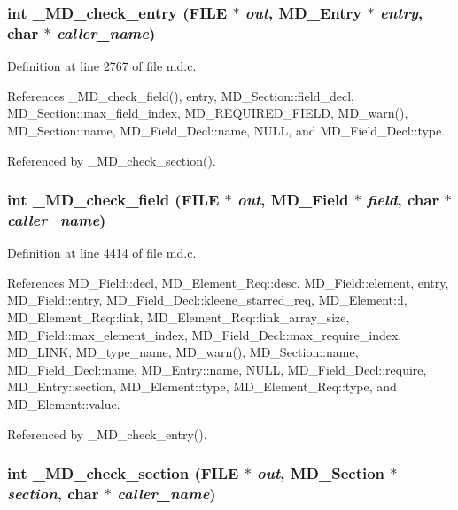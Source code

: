\subsubsection{\setlength{\rightskip}{0pt plus 5cm}int \_\-MD\_\-check\_\-entry (FILE $\ast$ {\em out}, \bf{MD\_\-Entry} $\ast$ {\em entry}, char $\ast$ {\em caller\_\-name})}\label{md_8c_5f7bc3cc69f39e3690dbdae2cd1d6507}




Definition at line 2767 of file md.c.

References \_\-MD\_\-check\_\-field(), entry, MD\_\-Section::field\_\-decl, MD\_\-Section::max\_\-field\_\-index, MD\_\-REQUIRED\_\-FIELD, MD\_\-warn(), MD\_\-Section::name, MD\_\-Field\_\-Decl::name, NULL, and MD\_\-Field\_\-Decl::type.

Referenced by \_\-MD\_\-check\_\-section().
\subsubsection{\setlength{\rightskip}{0pt plus 5cm}int \_\-MD\_\-check\_\-field (FILE $\ast$ {\em out}, \bf{MD\_\-Field} $\ast$ {\em field}, char $\ast$ {\em caller\_\-name})}\label{md_8c_e357e99d4f9c07917d1bc2e4c6859381}




Definition at line 4414 of file md.c.

References MD\_\-Field::decl, MD\_\-Element\_\-Req::desc, MD\_\-Field::element, entry, MD\_\-Field::entry, MD\_\-Field\_\-Decl::kleene\_\-starred\_\-req, MD\_\-Element::l, MD\_\-Element\_\-Req::link, MD\_\-Element\_\-Req::link\_\-array\_\-size, MD\_\-Field::max\_\-element\_\-index, MD\_\-Field\_\-Decl::max\_\-require\_\-index, MD\_\-LINK, MD\_\-type\_\-name, MD\_\-warn(), MD\_\-Section::name, MD\_\-Field\_\-Decl::name, MD\_\-Entry::name, NULL, MD\_\-Field\_\-Decl::require, MD\_\-Entry::section, MD\_\-Element::type, MD\_\-Element\_\-Req::type, and MD\_\-Element::value.

Referenced by \_\-MD\_\-check\_\-entry().
\subsubsection{\setlength{\rightskip}{0pt plus 5cm}int \_\-MD\_\-check\_\-section (FILE $\ast$ {\em out}, \bf{MD\_\-Section} $\ast$ {\em section}, char $\ast$ {\em caller\_\-name})}\label{md_8c_89a6fbf3ae7039a7f31768a50b21c521}




